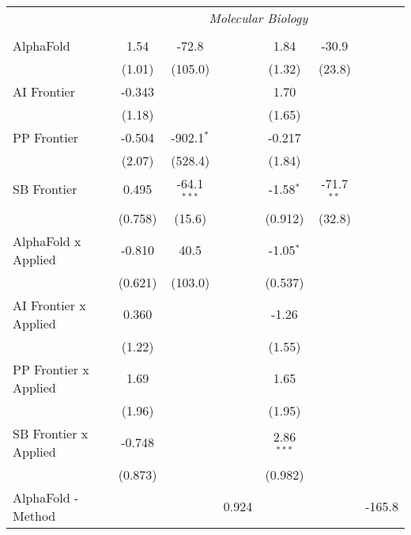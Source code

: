 \begin{tabular}{lcccccc}
 & \multicolumn{6}{c}{\textit{Molecular Biology}} \\ \\
   AlphaFold                    & 1.54    & -72.8         &         & 1.84         & -30.9        &   \\   
                                & (1.01)  & (105.0)       &         & (1.32)       & (23.8)       &   \\   
   AI Frontier                  & -0.343  &               &         & 1.70         &              &   \\   
                                & (1.18)  &               &         & (1.65)       &              &   \\   
   PP Frontier                  & -0.504  & -902.1$^{*}$  &         & -0.217       &              &   \\   
                                & (2.07)  & (528.4)       &         & (1.84)       &              &   \\   
   SB Frontier                  & 0.495   & -64.1$^{***}$ &         & -1.58$^{*}$  & -71.7$^{**}$ &   \\   
                                & (0.758) & (15.6)        &         & (0.912)      & (32.8)       &   \\   
   AlphaFold x Applied          & -0.810  & 40.5          &         & -1.05$^{*}$  &              &   \\   
                                & (0.621) & (103.0)       &         & (0.537)      &              &   \\   
   AI Frontier x Applied        & 0.360   &               &         & -1.26        &              &   \\   
                                & (1.22)  &               &         & (1.55)       &              &   \\   
   PP Frontier x Applied        & 1.69    &               &         & 1.65         &              &   \\   
                                & (1.96)  &               &         & (1.95)       &              &   \\   
   SB Frontier x Applied        & -0.748  &               &         & 2.86$^{***}$ &              &   \\   
                                & (0.873) &               &         & (0.982)      &              &   \\   
   AlphaFold - Method           &         &               & 0.924   &              &              & -165.8\\   

\end{tabular}
